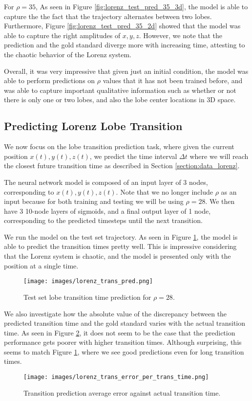 \documentclass[letterpaper, 10 pt, conference]{ieeeconf}  %
\begin{document}
For $\rho = 35$, As seen in Figure \ref{fig:lorenz_test_pred_35_3d}, the model is able to capture the the fact that the trajectory alternates between two lobes. Furthermore, Figure  \ref{fig:lorenz_test_pred_35_2d} showed that the model was able to capture the right amplitudes of $x,y,z$. However, we note that the prediction and the gold standard diverge more with increasing time, attesting to the chaotic behavior of the Lorenz system.

Overall, it was very impressive that given just an initial condition, the model was able to perform predictions on $\rho$ values that it has not been trained before, and was able to capture important qualitative information such as whether or not there is only one or two lobes, and also the lobe center locations in 3D space. 

\subsection{Predicting Lorenz Lobe Transition}
We now focus on the lobe transition prediction task, where given the current position $x(t),y(t),z(t)$, we predict the time interval $\Delta t$ where we will reach the closest future transition time as described in Section \ref{section:data_lorenz}.

The neural network model is composed of an input layer of 3 nodes, corresponding to $x(t), y(t), z(t)$. Note that we no longer include $\rho$ as an input because for both training and testing we will be using $\rho = 28$. We then have 3 10-node layers of sigmoids, and a final output layer of 1 node, corresponding to the predicted timesteps until the next transition. 

We run the model on the test set trajectory. As seen in Figure \ref{fig:lorenz_trans_pred}, the model is able to predict the transition times pretty well. This is impressive considering that the Lorenz system is chaotic, and the model is presented only with the position at a single time.

\begin{figure}[htb]
\centering
\texttt{[image: images/lorenz\_trans\_pred.png]}
\caption{Test set lobe transition time prediction for $\rho = 28$.}
\label{fig:lorenz_trans_pred}
\end{figure}

We also investigate how the absolute value of the discrepancy between the predicted transition time and the gold standard varies with the actual transition time. As seen in Figure \ref{fig:lorenz_trans_error}, it does not seem to be the case that the prediction performance gets poorer with higher transition times. Although surprising, this seems to match Figure \ref{fig:lorenz_trans_pred}, where we see good predictions even for long transition times. 
\begin{figure}[htb]
\centering
\texttt{[image: images/lorenz\_trans\_error\_per\_trans\_time.png]}
\caption{Transition prediction average error against actual transition time. }
\label{fig:lorenz_trans_error}
\end{figure}
\end{document}
